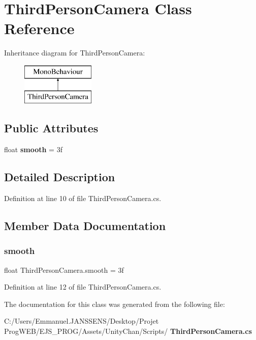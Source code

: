 \section{Third\+Person\+Camera Class Reference}
\label{class_third_person_camera}
Inheritance diagram for Third\+Person\+Camera\+:\begin{figure}[H]
\begin{center}
\leavevmode
\includegraphics[height=2.000000cm]{class_third_person_camera}
\end{center}
\end{figure}
\subsection*{Public Attributes}
\begin{DoxyCompactItemize}
\item 
float \textbf{ smooth} = 3f
\end{DoxyCompactItemize}


\subsection{Detailed Description}


Definition at line 10 of file Third\+Person\+Camera.\+cs.



\subsection{Member Data Documentation}
\mbox{\label{class_third_person_camera_a93dee71af7573bcb3c3f86f39f636c72}} 
\subsubsection{smooth}
{\footnotesize\ttfamily float Third\+Person\+Camera.\+smooth = 3f}



Definition at line 12 of file Third\+Person\+Camera.\+cs.



The documentation for this class was generated from the following file\+:\begin{DoxyCompactItemize}
\item 
C\+:/\+Users/\+Emmanuel.\+J\+A\+N\+S\+S\+E\+N\+S/\+Desktop/\+Projet Prog\+W\+E\+B/\+E\+J\+S\+\_\+\+P\+R\+O\+G/\+Assets/\+Unity\+Chan/\+Scripts/\textbf{ Third\+Person\+Camera.\+cs}\end{DoxyCompactItemize}

